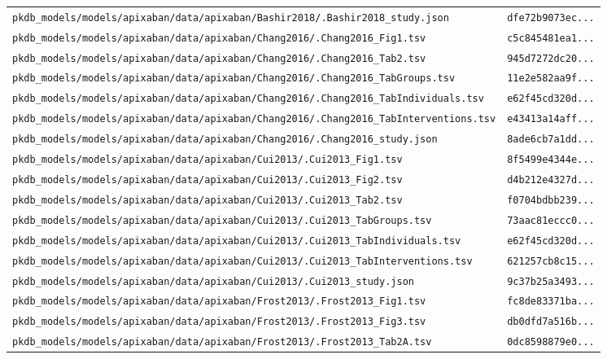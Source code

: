 \begin{longtable}{ll}
\texttt{pkdb\_models/models/apixaban/data/apixaban/Bashir2018/.Bashir2018\_study.json} & \texttt{dfe72b9073ec...} \\
\texttt{pkdb\_models/models/apixaban/data/apixaban/Chang2016/.Chang2016\_Fig1.tsv} & \texttt{c5c845481ea1...} \\
\texttt{pkdb\_models/models/apixaban/data/apixaban/Chang2016/.Chang2016\_Tab2.tsv} & \texttt{945d7272dc20...} \\
\texttt{pkdb\_models/models/apixaban/data/apixaban/Chang2016/.Chang2016\_TabGroups.tsv} & \texttt{11e2e582aa9f...} \\
\texttt{pkdb\_models/models/apixaban/data/apixaban/Chang2016/.Chang2016\_TabIndividuals.tsv} & \texttt{e62f45cd320d...} \\
\texttt{pkdb\_models/models/apixaban/data/apixaban/Chang2016/.Chang2016\_TabInterventions.tsv} & \texttt{e43413a14aff...} \\
\texttt{pkdb\_models/models/apixaban/data/apixaban/Chang2016/.Chang2016\_study.json} & \texttt{8ade6cb7a1dd...} \\
\texttt{pkdb\_models/models/apixaban/data/apixaban/Cui2013/.Cui2013\_Fig1.tsv} & \texttt{8f5499e4344e...} \\
\texttt{pkdb\_models/models/apixaban/data/apixaban/Cui2013/.Cui2013\_Fig2.tsv} & \texttt{d4b212e4327d...} \\
\texttt{pkdb\_models/models/apixaban/data/apixaban/Cui2013/.Cui2013\_Tab2.tsv} & \texttt{f0704bdbb239...} \\
\texttt{pkdb\_models/models/apixaban/data/apixaban/Cui2013/.Cui2013\_TabGroups.tsv} & \texttt{73aac81eccc0...} \\
\texttt{pkdb\_models/models/apixaban/data/apixaban/Cui2013/.Cui2013\_TabIndividuals.tsv} & \texttt{e62f45cd320d...} \\
\texttt{pkdb\_models/models/apixaban/data/apixaban/Cui2013/.Cui2013\_TabInterventions.tsv} & \texttt{621257cb8c15...} \\
\texttt{pkdb\_models/models/apixaban/data/apixaban/Cui2013/.Cui2013\_study.json} & \texttt{9c37b25a3493...} \\
\texttt{pkdb\_models/models/apixaban/data/apixaban/Frost2013/.Frost2013\_Fig1.tsv} & \texttt{fc8de83371ba...} \\
\texttt{pkdb\_models/models/apixaban/data/apixaban/Frost2013/.Frost2013\_Fig3.tsv} & \texttt{db0dfd7a516b...} \\
\texttt{pkdb\_models/models/apixaban/data/apixaban/Frost2013/.Frost2013\_Tab2A.tsv} & \texttt{0dc8598879e0...} \\

\end{longtable}
